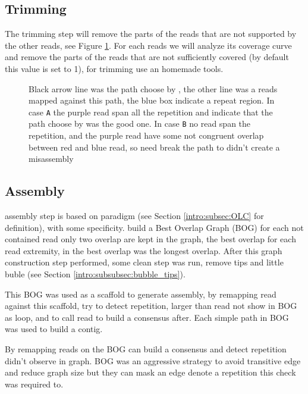 \documentclass[main]{subfiles}
\begin{document}
\subsection{Trimming}

The trimming step will remove the parts of the reads that are not supported by the other reads, see Figure \ref{sota:fig:canu:trimming}. For each reads we will analyze its coverage curve and remove the parts of the reads that are not sufficiently covered (by default this value is set to 1), for trimming \canu use an homemade tools. 


\begin{figure}[ht]
    \centering
    
    \caption{Black arrow line was the path choose by \canu, the other line was a reads mapped against this path, the blue box indicate a repeat region. In case \texttt{A} the purple read span all the repetition and indicate that the path choose by \canu was the good one. In case \texttt{B} no read span the repetition, and the purple read have some not congruent overlap between red and blue read, so \canu need break the path to didn't create a misassembly}
    \label{sota:fig:canu:trimming}
\end{figure}

\subsection{Assembly}

\canu assembly step is based on \OLC paradigm (see Section \ref{intro:subsec:OLC} for \OLC definition), with some specificity. \canu build a Best Overlap Graph (BOG) for each not contained read only two overlap are kept in the graph, the best overlap for each read extremity, in \canu the best overlap was the longest overlap. After this graph construction step performed, some clean step was run, remove tips and little buble (see Section \ref{intro:subsubsec:bubble_tips}).

This BOG was used as a scaffold to generate assembly, by remapping read against this scaffold, \canu try to detect repetition, larger than read not show in BOG as loop, and to call read to build a consensus after. Each simple path in BOG was used to build a contig. 

By remapping reads on the BOG \canu can build a consensus and detect repetition didn't observe in graph. BOG was an aggressive strategy to avoid transitive edge and reduce graph size but they can mask an edge denote a repetition this check was required to.
\end{document}
